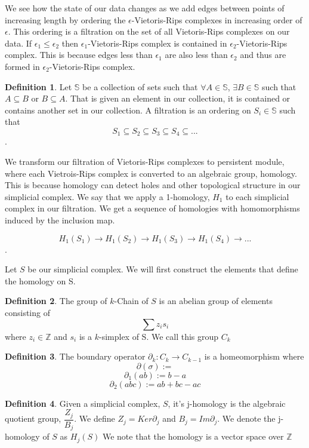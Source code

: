 \documentclass[12pt, a4paper, twocolumn, fullpage]{article}
\theoremstyle{plain}
\theoremstyle{definition}
\newtheorem{defn}{Definition}[section]
\theoremstyle{remark}
\begin{document}
We see how the state of our data changes as we add edges between points of increasing length by ordering the $\epsilon$-Vietoris-Rips complexes in increasing order of $\epsilon$. This ordering is a filtration on the set of all Vietoris-Rips complexes on our data. If $\epsilon_1 \leq \epsilon_2$ then $\epsilon_1$-Vietoris-Rips complex is contained in  $\epsilon_2$-Vietoris-Rips complex. This is because edges less than $\epsilon_1$ are also less than $\epsilon_2$ and thus are formed in  $\epsilon_2$-Vietoris-Rips complex.

\begin{defn}
Let $\mathbb{S}$ be a collection of sets such that $\forall A \in \mathbb{S}$, $\exists B \in \mathbb{S}$ such that $A \subseteq B$ or $B \subseteq A$. That is given an element in our collection, it is contained or contains another set in our collection. 
A filtration is an ordering on $S_i \in \mathbb{S}$ such that
$$S_1 \subseteq S_2 \subseteq S_3 \subseteq S_4 \subseteq ...$$.
\end{defn}
 
We transform our filtration of Vietoris-Rips complexes to persistent module, where each Vietrois-Rips complex is converted to an algebraic group, homology. This is because homology can detect holes and other topological structure in our simplicial complex. We say that we apply a 1-homology, $H_1$ to each simplicial complex in our filtration. We get a sequence of homologies with homomorphisms induced by the inclusion map.

$$ H_1(S_1) \rightarrow H_1(S_2) \rightarrow H_1(S_3) \rightarrow H_1(S_4) \rightarrow ...$$.

Let $S$ be our simplicial complex. We will first construct the elements that define the homology on S.

\begin{defn}
The group of $k$-Chain of $S$ is an abelian group of elements consisting of 
$$\sum z_i s_i $$ where $z_i \in \mathbb{Z}$ and $s_i$ is a $k$-simplex of S.
We call this group $C_k$
\end{defn}

\begin{defn}
The boundary operator $\partial_k : C_k \rightarrow C_{k-1}$ is a homeomorphism where
$$\partial (\sigma) := $$ %
$$\partial_1 (ab) := b-a$$
$$\partial_2 (abc) := ab+bc-ac$$
\end{defn}

\begin{defn}
Given a simplicial complex, $S$, it's j-homology is the algebraic quotient group, $\dfrac{Z_j}{B_j}$.
We define $Z_j = Ker \partial _j$ and $B_j = Im \partial_j$.
We denote the j-homology of $S$ as $H_j(S)$
We note that the homology is a vector space over $\mathbb{Z}$
\end{defn}
 
\end{document}
